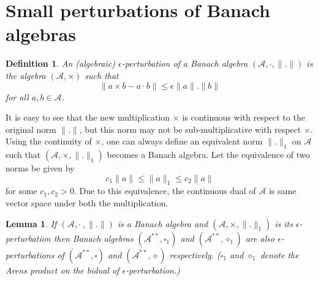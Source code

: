 \documentclass[pdflatex,sn-mathphys-num]{sn-jnl}%
\newtheorem{definition}{Definition}
\theoremstyle{thmstyleone}%
\newtheorem{lemma}{Lemma}
\theoremstyle{thmstyletwo}%
\theoremstyle{thmstylethree}%
\begin{document}
 \section{Small perturbations of Banach algebras}
\begin{definition} \cite{Jarosz1985} An (algebraic) $\epsilon$-perturbation of a Banach algebra $(\mathcal A, \boldsymbol{\cdot},\|.\|)$ is  the algebra $(\mathcal A, \times)$ such that $$\|a\times b-a\cdot b\|\leq \epsilon\|a\|.\|b\|$$ for all $a,b\in \mathcal A$.\end{definition}  It is easy to see that the new multiplication $\times$ is continuous with respect to the original norm $\|.\|$, but this norm may not be sub-multiplicative with respect $\times$. Using the continuity of $\times$, one can always define an equivalent norm $\|.\|_1$ on $\mathcal A$ such that $(\mathcal A, \times, \|.\|_1)$ becomes a Banach algebra. Let the equivalence of two  norms be given by $$c_1\|a\|\leq \|a\|_1\leq c_2\|a\|$$  for some $c_1,c_2>0$. Due to this equivalence, the continuous dual of $\mathcal A$ is same vector space under both the multiplication.
 \begin{lemma}\label{perturb}
 	If $(\mathcal A, \cdot~, \|.\|)$ is a Banach algebra and $(\mathcal A, \times, \|.\|_1)$ is its $\epsilon$- perturbation then Banach algebras $(\mathcal A^{**},\square_1)$ and $(\mathcal A^{**}, \diamond_1)$ are also $\epsilon$-perturbations of $(\mathcal A^{**},\square )$ and $(\mathcal A^{**},\diamond)$ respectively. ($\square_1$ and $\diamond_1$ denote the Arens product on the bidual of $\epsilon$-perturbation.)
 \end{lemma}
\end{document}
